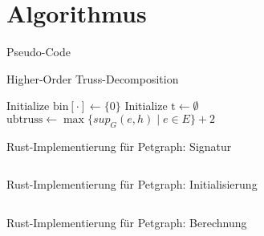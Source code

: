 \section{Algorithmus}

\begin{frame}{Pseudo-Code}
    \begin{algorithm}[H]
        \tiny
        \caption{Higher-Order Truss-Decomposition}

        Initialize $\text{bin}[\cdot] \leftarrow \{0\}$\;
        Initialize $\text{t} \leftarrow \emptyset$\;
        $\text{ubtruss} \leftarrow \max\{sup_G(e, h) \mid e \in E\} + 2$\;
        \;
    \end{algorithm}
\end{frame}

\begin{frame}{Rust-Implementierung für Petgraph: Signatur}
    \begin{listing}[H]
        \inputminted[linenos=true]{rust}{Code/signature.rs}
    \end{listing}
\end{frame}

\begin{frame}{Rust-Implementierung für Petgraph: Initialisierung}
    \begin{listing}[H]
        \inputminted[linenos=true]{rust}{Code/alg_init.rs}
    \end{listing}
\end{frame}

\begin{frame}{Rust-Implementierung für Petgraph: Berechnung}
    \begin{listing}[H]
        \tiny
        \inputminted[linenos=true]{rust}{Code/alg_core.rs}
    \end{listing}
\end{frame}
